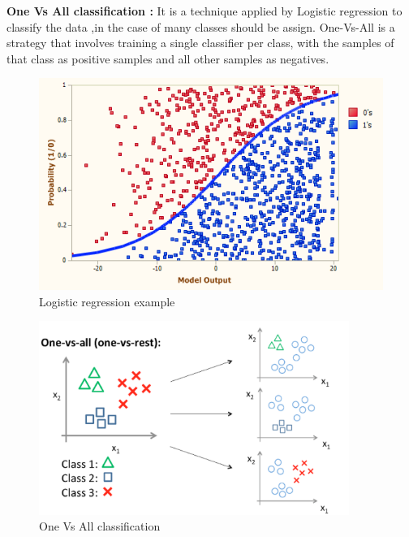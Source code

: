 \textbf{One Vs All classification : }It is a technique applied by Logistic regression to classify the
data ,in the case of many classes should be assign.
One-Vs-All is a strategy that involves training a single classifier per class, with the samples of
that class as positive samples and all other samples as negatives.
\newpage
\begin{figure}[!h]
    \centering
    \includegraphics[width=1\textwidth]{chapters/chapter02/fig02/lr.png}
    \caption{Logistic regression example}
    \label{fig:my_label}
\end{figure} 
\begin{figure}[!h]
    \centering
    \includegraphics[width=0.9\textwidth]{chapters/chapter02/fig02/ova.png}
    \caption{One Vs All classification}
    \label{fig:my_label}
\end{figure} 
\newpage
